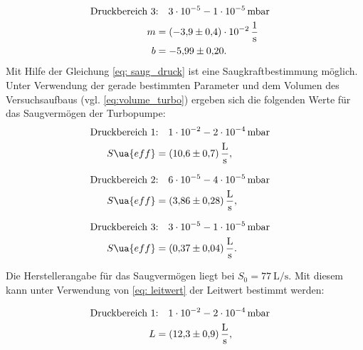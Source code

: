 \begin{align}
  \label{eq: regression_turbo_druck_3}
  \begin{aligned}
  \text{Druckbereich 3} &\text{:}\quad \num{3e-5} - \num{1e-05} \, \text{mbar}& \\
  m&=\SI{-3.9\pm0.4 e-2}{\per\second} \\
  b&=\num{-5.99 \pm0.20 }.
\end{aligned}
\end{align}
Mit Hilfe der Gleichung \eqref{eq: saug_druck} ist eine Saugkraftbestimmung möglich.
Unter Verwendung der gerade bestimmten Parameter und dem Volumen des Versuchsaufbaus
(vgl. \eqref{eq:volume_turbo}) ergeben sich die folgenden Werte für das Saugvermögen der Turbopumpe:
\begin{align}
  \label{eq:turbo_saug_1}
  \begin{aligned}
    \text{Druckbereich 1} &\text{:}\quad \num{1e-2} - \num{2e-4} \, \text{mbar}& \\
   S\ua{eff}&=\SI{10.6\pm 0.7}{\litre\per\second},
\end{aligned}
\end{align}

\begin{align}
  \label{eq:turbo_saug_2}
  \begin{aligned}
  \text{Druckbereich 2} &\text{:}\quad \num{6e-5} - \num{4e-05} \, \text{mbar}& \\
   S\ua{eff}&=\SI{3.86\pm 0.28}{\litre\per\second},
\end{aligned}
\end{align}

\begin{align}
  \label{eq:turbo_saug_3}
  \begin{aligned}
    \text{Druckbereich 3} &\text{:}\quad \num{3e-5} - \num{1e-05} \, \text{mbar}& \\
   S\ua{eff}&=\SI{0.37\pm 0.04}{\litre\per\second}.
\end{aligned}
\end{align}

Die Herstellerangabe für das Saugvermögen liegt bei $S_0=\SI{77}{\liter\per\second}$.
Mit diesem kann unter Verwendung von \eqref{eq: leitwert} der Leitwert bestimmt werden:

\begin{align}
  \label{eq:turbo_leit_1}
  \begin{aligned}
    \text{Druckbereich 1} &\text{:}\quad \num{1e-2} - \num{2e-4} \, \text{mbar}& \\
   L&=\SI{12.3\pm 0.9}{\litre\per\second},
\end{aligned}
\end{align}

